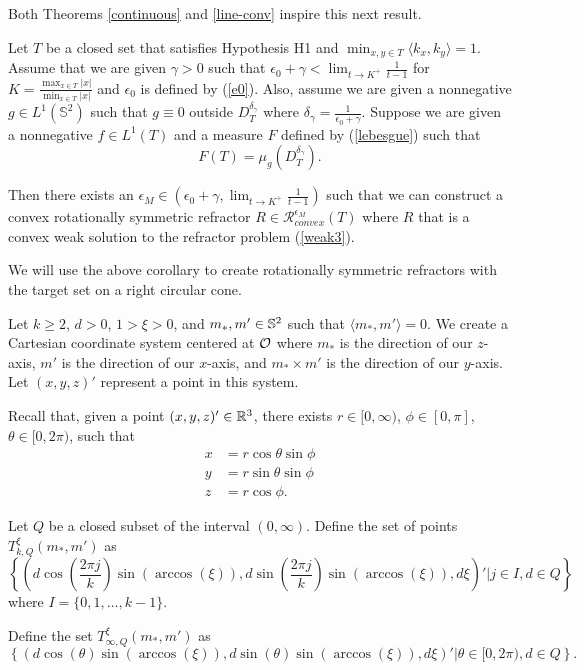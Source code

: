 \documentclass[review]{elsarticle}
\begin{document}
Both Theorems \ref{continuous} and \ref{line-conv} inspire this next result. 

\begin{coro}\label{line-conv-continuous}
Let $T$ be a closed set that satisfies Hypothesis H1 and $\min_{x,y\in T}\langle k_x,k_y\rangle=1$. Assume that we are given $\gamma>0$ such that $\epsilon_0+\gamma<\lim_{t\to K^+}\frac{1}{t-1}$ for $K=\frac{\max_{x\in T} |x|}{\min_{x\in T} |x|}$ and $\epsilon_0$ is defined by (\ref{e0}). Also, assume we are given a nonnegative $g\in L^1(\mathbb{S}^2)$ such that $g\equiv 0$ outside $D_T^{\delta_\gamma}$ where $\delta_\gamma=\frac1{\epsilon_0+\gamma}$. Suppose we are given a nonnegative $f\in L^1(T)$ and a measure $F$ defined by (\ref{lebesgue}) such that
\begin{equation}
    F(T) = \mu_{g}(D_T^{\delta_\gamma}).
\end{equation}


Then there exists an $\epsilon_M\in(\epsilon_0+\gamma,\lim_{t\to K^+}\frac{1}{t-1})$ such that we can construct a convex rotationally symmetric refractor $R  \in \mathcal{R}_{convex}^{\epsilon_M} (T)$ where $R$ that is a convex weak solution to the refractor problem (\ref{weak3}).    
\end{coro}

We will use the above corollary to create rotationally symmetric refractors with the target set on a right circular cone.  


\begin{Def}\label{circlinedef}
Let $k\ge 2$, $d>0$, $1>\xi>0$, and $m_*,m'\in \mathbb{S}^2$ such that $\langle m_*,m'\rangle=0$. We create a Cartesian coordinate system centered at $\mathcal{O}$ where $m_*$ is the direction of our $z$-axis, $m'$ is the direction of our $x$-axis, and $m_*\times m'$ is the direction of our $y$-axis. Let $(x,y,z)'$ represent a point in this system. 

Recall that, given a point $(x,y,z)'\in \mathbb{R}^3$, there exists $r \in [0, \infty)$, $\phi \in [0, \pi]$, $\theta \in [0, 2\pi)$, such that
\begin{align}
    x&=r\cos\theta \sin\phi\\
    y&=r\sin\theta\sin\phi\\
    z&=r\cos\phi.
\end{align}

Let $Q$ be a closed subset of the interval $(0,\infty)$. Define the set of points $T_{k,Q}^\xi(m_*,m')$ as
\begin{equation}
    \left\{\left(d\cos\left(\frac{2\pi j}k\right)\sin\left(\arccos(\xi)\right),d\sin\left(\frac{2\pi j}k\right)\sin\left(\arccos(\xi)\right),d\xi\right)'|j\in I, d\in Q\right\}
\end{equation}
where $I=\{0,1,\dots,k-1\}.$

Define the set $T_{\infty,Q}^\xi(m_*,m')$ as
\begin{equation}
    \left\{\left(d\cos\left(\theta\right)\sin\left(\arccos(\xi)\right),d\sin\left(\theta\right)\sin\left(\arccos(\xi)\right),d\xi\right)'|\theta\in [0,2\pi), d\in Q\right\}.
\end{equation}
\end{Def}
\end{document}
